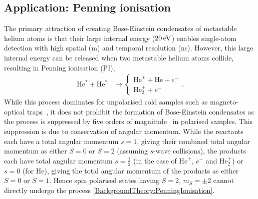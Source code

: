 
\subsection{Application: Penning ionisation}
\label{BackgroundTheory:PenningIonisation}

The primary attraction of creating Bose-Einstein condensates of metastable helium atoms is that their large internal energy ($\unit[20]{eV}$) enables single-atom detection with high spatial (\micro m) and temporal resolution (ns). However, this large internal energy can be released when two metastable helium atoms collide, resulting in Penning ionisation (PI),
\begin{align}
    \label{BackgroundTheory:PenningIonisation}
    \text{He}^* + \text{He}^* & \rightarrow \left\{
        \begin{matrix}
            \text{He}^+ + \text{He} + e^-\\
            \text{He}_2^+ + e^-
        \end{matrix}\right..
\end{align}
While this process dominates for unpolarised cold samples such as magneto-optical traps~\citep{Bardou:1992}, it does not prohibit the formation of Bose-Einstein condensates as the process is suppressed by five orders of magnitude~\citep{Shlyapnikov:1994} in polarised samples.  This suppression is due to conservation of angular momentum. While the reactants each have a total angular momentum $s=1$, giving their combined total angular momentum as either $S=0$ or $S=2$ (assuming $s$-wave collisions), the products each have total angular momentum $s=\frac{1}{2}$ (in the case of $\text{He}^+$, $e^-$ and $\text{He}_2^+$) or $s=0$ (for $\text{He}$), giving the total angular momentum of the products as either $S=0$ or $S=1$. Hence spin polarised states having $S=2$, $m_S=\pm2$ cannot directly undergo the process \eqref{BackgroundTheory:PenningIonisation}.

